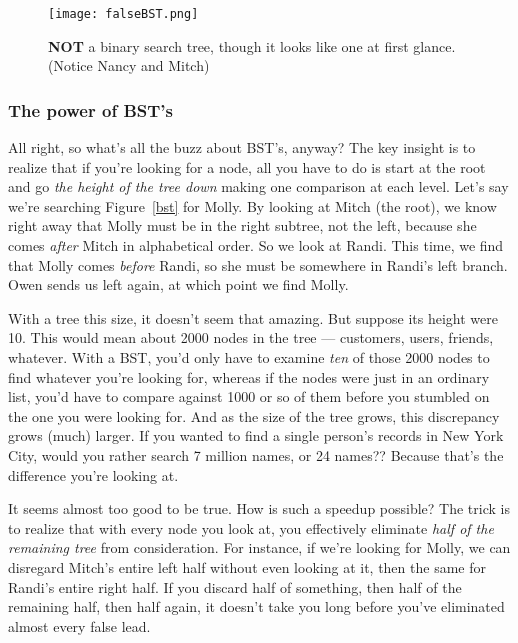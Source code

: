 \begin{figure}[ht]
\centering
\texttt{[image: falseBST.png]}
\caption{\textbf{NOT} a binary search tree, though
it looks like one at first glance. (Notice Nancy and Mitch)}
\label{falsebst}
\end{figure}

\subsubsection{The power of BST's}

All right, so what's all the buzz about BST's, anyway? The key insight is
to realize that if you're looking for a node, all you have to do is start
at the root and go \textit{the height of the tree down} making one
comparison at each level. Let's say we're searching Figure~\ref{bst} for
Molly. By looking at Mitch (the root), we know right away that Molly must
be in the right subtree, not the left, because she comes \textit{after}
Mitch in alphabetical order. So we look at Randi. This time, we find that
Molly comes \textit{before} Randi, so she must be somewhere in Randi's left
branch. Owen sends us left again, at which point we find Molly.

With a tree this size, it doesn't seem that amazing. But suppose its height
were 10. This would mean about 2000 nodes in the tree --- customers, users,
friends, whatever. With a BST, you'd only have to examine \textit{ten} of
those 2000 nodes to find whatever you're looking for, whereas if the nodes
were just in an ordinary list, you'd have to compare against 1000 or so of
them before you stumbled on the one you were looking for. And as the size
of the tree grows, this discrepancy grows (much) larger. If you wanted to
find a single person's records in New York City, would you rather search 7
million names, or 24 names?? Because that's the difference you're looking
at.

It seems almost too good to be true. How is such a speedup possible? The
trick is to realize that with every node you look at, you effectively
eliminate \textit{half of the remaining tree} from consideration. For
instance, if we're looking for Molly, we can disregard Mitch's entire left
half without even looking at it, then the same for Randi's entire right
half. If you discard half of something, then half of the remaining half,
then half again, it doesn't take you long before you've eliminated almost
every false lead.

